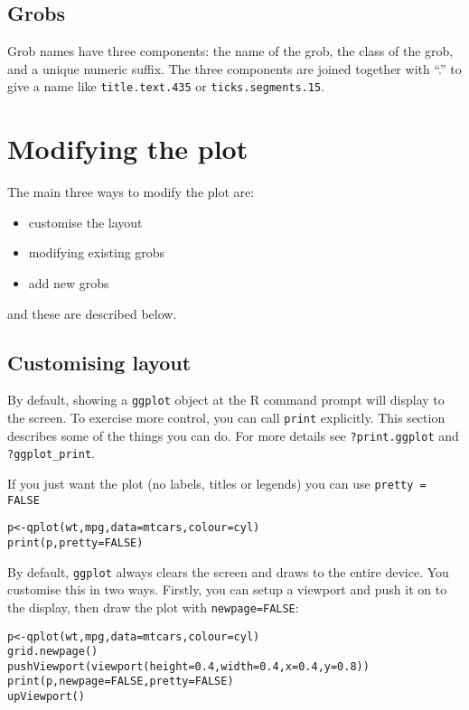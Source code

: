 \subsection{Grobs}
\label{sub:grobs}

Grob names have three components: the name of the grob, the class of the grob, and a unique numeric suffix.  The three components are joined together with ``.'' to give a name like {\tt title.text.435} or {\tt ticks.segments.15}.


\newpage
\section{Modifying the plot}

The main three ways to modify the plot are:

\begin{itemize}
  \item customise the layout
  \item modifying existing grobs
  \item add new grobs
\end{itemize}

\noindent and these are described below.

\subsection{Customising layout}\label{sec:controlling_output}

By default, showing a {\tt ggplot} object at the R command prompt will display to the screen.  To exercise more control, you can call {\tt print} explicitly.  This section describes some of the things you can do.  For more details see {\tt ?print.ggplot} and {\tt ?ggplot\_print}.

If you just want the plot (no labels, titles or legends) you can use {\tt pretty = FALSE}

\begin{alltt}
p <- qplot(wt, mpg, data=mtcars, colour=cyl)
print(p, pretty = FALSE)
\end{alltt}

By default, {\tt ggplot} always clears the screen and draws to the entire device.  You customise this in two ways.  Firstly, you can setup a viewport and push it on to the display, then draw the plot with {\tt newpage=FALSE}:

\begin{alltt}
p <- qplot(wt, mpg, data=mtcars, colour=cyl)
grid.newpage()
pushViewport(viewport(height=0.4, width=0.4, x=0.4, y=0.8))
print(p, newpage=FALSE, pretty=FALSE)
upViewport()
\end{alltt}

